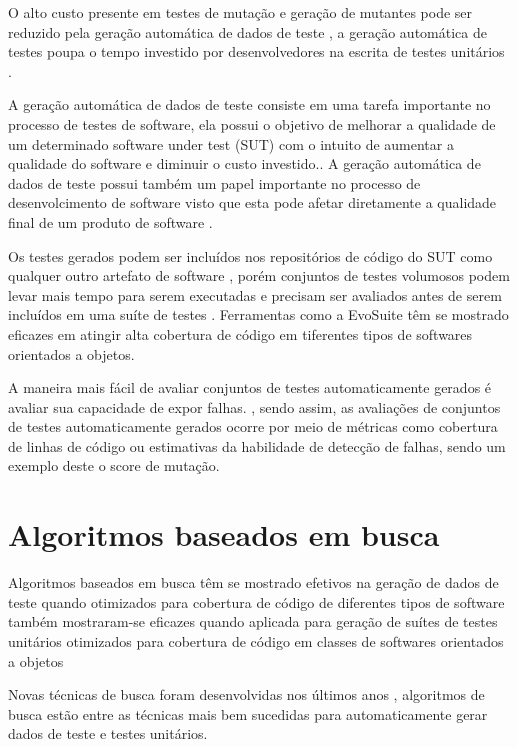 \documentclass[
	12pt,				%
	oneside,			%
	a4paper,			%
	english,			%
	brazil				%
	]{abntex2ppgsi}
\begin{document}
O alto custo presente em testes de mutação e geração de mutantes pode ser reduzido pela geração automática de dados de teste \cite{dave2015}, a geração automática de testes poupa o tempo investido por desenvolvedores na escrita de testes unitários \cite{shamshiri2018}.

A geração automática de dados de teste consiste em uma tarefa importante no processo de testes de software, ela possui o objetivo de melhorar a qualidade de um determinado software under test (SUT) com o intuito de aumentar a qualidade do software e diminuir o custo investido.\cite{shamriski20151115}. A geração automática de dados de teste possui também um papel importante no processo de desenvolcimento de software visto que esta pode afetar diretamente a qualidade final de um produto de software \cite{dave2015}.

Os testes gerados podem ser incluídos nos repositórios de código do SUT como qualquer outro artefato de software \cite{shamshiri2018}, porém conjuntos de testes volumosos podem levar mais tempo para serem executadas e precisam ser avaliados antes de serem incluídos em uma suíte de testes \cite{shamriski20151115}. Ferramentas como a EvoSuite têm se mostrado eficazes em atingir alta cobertura de código em tiferentes tipos de softwares orientados a objetos. \cite{Campos2017}

A maneira mais fácil de avaliar conjuntos de testes automaticamente gerados é avaliar sua capacidade de expor falhas. \cite{shamshiri2018}, sendo assim, as avaliações de conjuntos de testes automaticamente gerados ocorre por meio de métricas como cobertura de linhas de código ou estimativas da habilidade de detecção de falhas, sendo um exemplo deste o score de mutação. \cite{shamshiri2018}





\section{Algoritmos baseados em busca}
Algoritmos baseados em busca têm se mostrado efetivos na geração de dados de teste quando otimizados para cobertura de código de diferentes tipos de software \cite{Campos2017} também mostraram-se eficazes quando aplicada para geração de suítes de testes unitários otimizados para cobertura de código em classes de softwares orientados a objetos\cite{Campos2017}

Novas técnicas de busca foram desenvolvidas nos últimos anos \cite{rojas2017b}, algoritmos de busca estão entre as técnicas mais bem sucedidas para automaticamente gerar dados de teste e testes unitários. \cite{rojas2017b}
\end{document}
